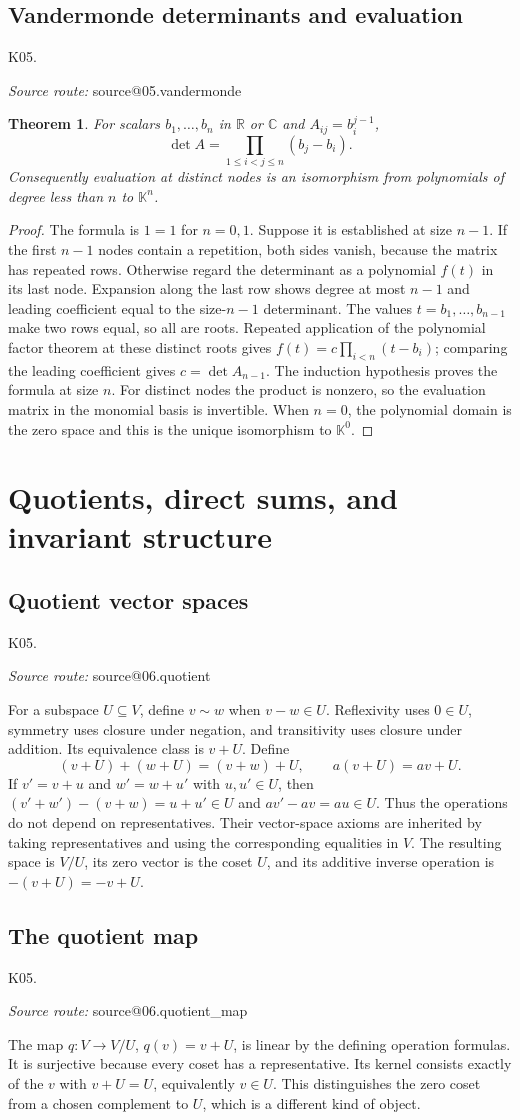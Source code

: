 \documentclass[11pt,a4paper]{book}
\makeatletter
\newtheorem{theorem}{Theorem}[chapter]
\theoremstyle{definition}\newtheorem{definition}[theorem]{Definition}
\theoremstyle{remark}\newtheorem{remark}[theorem]{Remark}
\newcommand{\K}{\mathbb K}\newcommand{\R}{\mathbb R}\newcommand{\C}{\mathbb C}
\newcommand{\Kentry}[2]{\section{#2}\label{k:#1}\noindent\textsf{\small K05.\detokenize{#1}}\par
  \begingroup\small\color{black!65}\textit{Source route: }\csname source@#1\endcsname\par\endgroup}
\makeatother
\begin{document}
\Kentry{05.vandermonde}{Vandermonde determinants and evaluation}
\begin{theorem}
For scalars $b_1,\ldots,b_n$ in $\R$ or $\C$ and $A_{ij}=b_i^{j-1}$,
\[\det A=\prod_{1\le i<j\le n}(b_j-b_i).\]
Consequently evaluation at distinct nodes is an isomorphism from polynomials of degree less than $n$ to $\K^n$.
\end{theorem}
\begin{proof}
The formula is $1=1$ for $n=0,1$. Suppose it is established at size $n-1$. If the first $n-1$ nodes contain a repetition, both sides vanish, because the matrix has repeated rows. Otherwise regard the determinant as a polynomial $f(t)$ in its last node. Expansion along the last row shows degree at most $n-1$ and leading coefficient equal to the size-$n-1$ determinant. The values $t=b_1,\ldots,b_{n-1}$ make two rows equal, so all are roots. Repeated application of the polynomial factor theorem at these distinct roots gives
$f(t)=c\prod_{i<n}(t-b_i)$; comparing the leading coefficient gives $c=\det A_{n-1}$. The induction hypothesis proves the formula at size $n$. For distinct nodes the product is nonzero, so the evaluation matrix in the monomial basis is invertible. When $n=0$, the polynomial domain is the zero space and this is the unique isomorphism to $\K^0$.
\end{proof}



\chapter{Quotients, direct sums, and invariant structure}

\Kentry{06.quotient}{Quotient vector spaces}
For a subspace $U\subseteq V$, define $v\sim w$ when $v-w\in U$. Reflexivity uses $0\in U$, symmetry uses closure under negation, and transitivity uses closure under addition. Its equivalence class is $v+U$. Define
\[(v+U)+(w+U)=(v+w)+U,\qquad a(v+U)=av+U.\]
If $v'=v+u$ and $w'=w+u'$ with $u,u'\in U$, then $(v'+w')-(v+w)=u+u'\in U$ and $av'-av=au\in U$. Thus the operations do not depend on representatives. Their vector-space axioms are inherited by taking representatives and using the corresponding equalities in $V$. The resulting space is $V/U$, its zero vector is the coset $U$, and its additive inverse operation is $-(v+U)=-v+U$.

\Kentry{06.quotient_map}{The quotient map}
The map $q:V\to V/U$, $q(v)=v+U$, is linear by the defining operation formulas. It is surjective because every coset has a representative. Its kernel consists exactly of the $v$ with $v+U=U$, equivalently $v\in U$. This distinguishes the zero coset from a chosen complement to $U$, which is a different kind of object.
\end{document}
